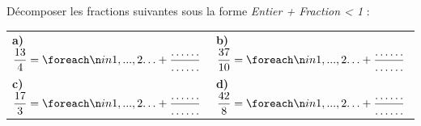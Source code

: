 \documentclass[a4paper]{book}
\begin{document}
    \begin{exemple}
        Décomposer les fractions suivantes sous la forme \textit{Entier + Fraction < 1} :
        \begin{center}
            \renewcommand{\arraystretch}{2.5}
            \begin{tabularx}{\textwidth}{XX}
                \textbf{a)} $\dfrac{13}{4} = \points[2] + \dfrac{\dots\dots}{\dots\dots}$ & \textbf{b)} $\dfrac{37}{10} = \points[2] + \dfrac{\dots\dots}{\dots\dots}$ \\[20ex]
                \textbf{c)} $\dfrac{17}{3} = \points[2] + \dfrac{\dots\dots}{\dots\dots}$ & \textbf{d)} $\dfrac{42}{8} = \points[2] + \dfrac{\dots\dots}{\dots\dots}$ \\
            \end{tabularx}
        \end{center}
    \end{exemple}
\end{document}
